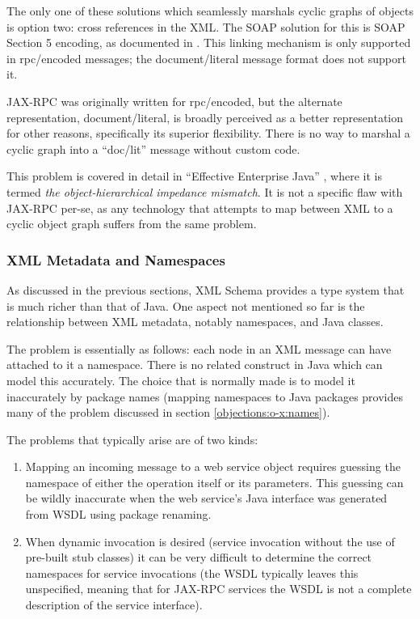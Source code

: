 The only one of these solutions which seamlessly marshals cyclic graphs of
objects is option two: cross references in the XML. The SOAP solution for this
is SOAP Section 5 encoding, as documented in \cite{spec:SOAP1.1}. This linking
mechanism is only supported in rpc/encoded messages; the
document/literal message format does not support it. 

JAX-RPC was originally written for rpc/encoded, but the alternate
representation, document/literal, is broadly perceived as a better
representation for other reasons, specifically its superior flexibility. There
is no way to marshal a cyclic graph into a ``doc/lit'' message without custom
code. 

This problem is covered in detail in ``Effective Enterprise Java'' 
\cite{neward:EEJ}, where it is termed \emph{the object-hierarchical impedance
mismatch}. It is not a specific flaw with JAX-RPC per-se, as any technology that
attempts to map between XML to a cyclic object graph suffers from the same
problem.  




\subsubsection{XML Metadata and Namespaces}
\label{objections:o-x:namespaces}

As discussed in the previous sections, XML Schema provides a type
system that is much richer than that of Java. One aspect not mentioned
so far is the relationship between XML metadata, notably namespaces,
and Java classes.

The problem is essentially as follows: each node in an XML message can
have attached to it a namespace. There is no related construct in Java
which can model this accurately. The choice that is normally made is
to model it inaccurately by package names (mapping namespaces to Java
packages provides many of the problem discussed in section
\ref{objections:o-x:names}). 

The problems that typically arise are of two kinds:
\begin{enumerate}
\item Mapping an incoming message to a web service object requires
guessing the namespace of either the operation itself or its
parameters. This guessing can be wildly inaccurate when the web
service's Java interface was generated from WSDL using package
renaming.
\item When dynamic invocation is desired (service invocation without
the use of pre-built stub classes) it can be very difficult to
determine the correct namespaces for service invocations (the WSDL
typically leaves this unspecified, meaning that for JAX-RPC services
the WSDL is not a complete description of the service interface).
\end{enumerate}

